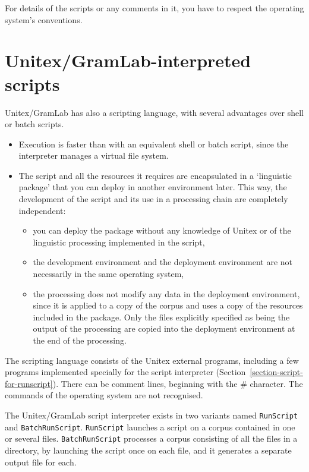\noindent For details of the scripts or any comments in it, you have to respect the operating system's
 conventions.



\section{Unitex/GramLab-interpreted scripts}
\label{section-unitex-scripts}

Unitex/GramLab has also a scripting language, with several advantages over shell or batch
scripts.
\begin{itemize}
    \item Execution is faster than with an equivalent shell or batch script, since the interpreter manages a
virtual file system.
    \item The script and all the resources it requires are encapsulated in a `linguistic package'
    that you can deploy in another environment later. This way, the development of the script and its
    use in a processing chain are completely independent:
\begin{itemize}
    \item you can deploy the package without any knowledge of Unitex or of the linguistic processing
    implemented in the script,
    \item the development environment and the deployment environment are not necessarily
    in the same operating system,
    \item the processing does not modify any data in the deployment environment, since it is applied
    to a copy of the corpus and uses a copy of the resources included in the package. Only the files
explicitly specified as being the output of the processing are copied into the deployment environment at the end 
of the processing.
\end{itemize}
\end{itemize}

\noindent The scripting language consists of the Unitex external programs, including
a few programs implemented specially for the script interpreter 
(Section~\ref{section-script-for-runscript}). There can be comment lines, beginning with 
the  \# character. The commands of the operating system are not recognised.

\bigskip{}
\noindent The Unitex/GramLab script interpreter exists in two variants named \verb$RunScript$ and
\verb$BatchRunScript$. \verb$RunScript$ launches a script on a corpus contained in one or several files.
\verb$BatchRunScript$ processes a corpus consisting of all the files in a directory,
by launching the script once on each file, and it generates a separate output file for each.




